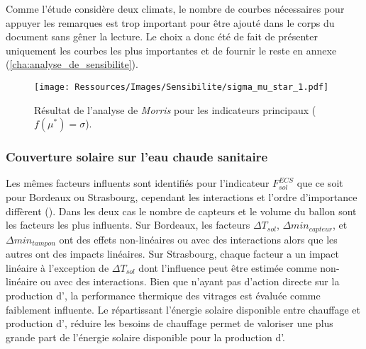 Comme l’étude considère deux climats, le nombre de courbes nécessaires pour appuyer
les remarques est trop important pour être ajouté dans le corps du document sans gêner
la lecture. Le choix a donc été de fait de présenter uniquement les courbes les plus
importantes et de fournir le reste en annexe (\ref{cha:analyse_de_sensibilite}).

\begin{figure}
    \centering
    \texttt{[image: Ressources/Images/Sensibilite/sigma\_mu\_star\_1.pdf]}
    \caption{Résultat de l’analyse de \textit{Morris} pour les indicateurs principaux
             ($f(\mu^{*}) = \sigma$).}
    \label{fig:objectifs_mu_star}
\end{figure}


\subsubsection{Couverture solaire sur l’eau chaude sanitaire} %
\label{ssub:couverture_solaire_sur_l_ECS}
Les mêmes facteurs influents sont identifiés pour l’indicateur $F_{sol}^{ECS}$ que ce soit
pour Bordeaux ou Strasbourg, cependant les interactions et l’ordre d’importance diffèrent
(). Dans les deux cas le nombre de capteurs  et le
volume du ballon  sont les facteurs les plus influents. Sur Bordeaux, les
facteurs $\Delta T_{sol}$, $\Delta min_{capteur}$, et $\Delta min_{tampon}$ ont des effets
non-linéaires ou avec des interactions alors que les autres ont des impacts linéaires. Sur
Strasbourg, chaque facteur a un impact linéaire à l’exception de $\Delta T_{sol}$ dont
l’influence peut être estimée comme non-linéaire ou avec des interactions. Bien que
n’ayant pas d’action directe sur la production d’, la performance thermique des
vitrages est évaluée comme faiblement influente. Le  répartissant l’énergie
solaire disponible entre chauffage et production d’, réduire les besoins de
chauffage permet de valoriser une plus grande part de l’énergie solaire disponible pour la
production d’.


